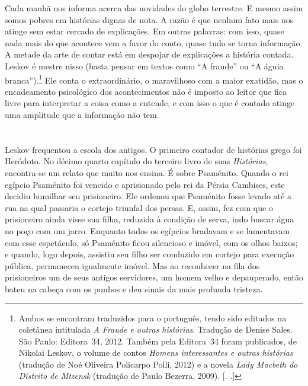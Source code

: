 Cada manhã nos informa acerca das novidades do globo terrestre. E mesmo
assim somos pobres em histórias dignas de nota. A razão é que nenhum
fato mais nos atinge sem estar cercado de explicações. Em outras
palavras: com isso, quase nada mais do que acontece vem a favor do
conto, quase tudo se torna informação. A metade da arte de contar está em
despojar de explicações a história contada\label{supra3}. Leskov é mestre nisso (basta
pensar em textos como ``A fraude'' ou ``A águia branca'').\footnote{Ambos
  se encontram traduzidos para o português, tendo sido editados na
  coletânea intitulada \emph{A Fraude e outras histórias}. Tradução de
  Denise Sales. São Paulo: Editora~34, 2012. Também pela Editora~34
  foram publicados, de Nikolai Leskov, o volume de contos \emph{Homens
  interessantes e outras histórias} (tradução de Noé Oliveira Policarpo
  Polli, 2012) e a novela \emph{Lady Macbeth do Distrito de Mtzensk}
  (tradução de Paulo Bezerra, 2009). [. .]} Ele
conta o extraordinário, o maravilhoso com a maior exatidão, mas o
encadeamento psicológico dos acontecimentos não é imposto ao leitor
que fica livre para interpretar a coisa como a entende, e com isso o
que é contado atinge uma amplitude que a informação não tem.

\section{}

Leskov frequentou a escola dos antigos. O primeiro contador de histórias
grego foi Heródoto. No décimo quarto capítulo do terceiro livro de suas
\emph{Histórias}, encontra-se um relato que muito nos ensina. É sobre
Psaménito. Quando o rei egípcio Psaménito foi vencido e aprisionado pelo
rei da Pérsia Cambises, este decidiu humilhar seu prisioneiro. Ele
ordenou que Psaménito fosse levado até a rua na qual passaria o cortejo
triunfal dos persas. E, assim, fez com que o prisioneiro ainda visse sua
filha, reduzida à condição de serva, indo buscar água no poço com um
jarro. Enquanto todos os egípcios bradavam e se lamentavam com esse
espetáculo, só Psaménito ficou silencioso e imóvel, com os olhos baixos;
e quando, logo depois, assistiu seu filho ser conduzido em cortejo para
execução pública, permaneceu igualmente imóvel. Mas ao reconhecer na
fila dos prisioneiros um de seus antigos servidores, um homem velho e
depauperado, então bateu na cabeça com os punhos e deu sinais da mais
profunda tristeza.

